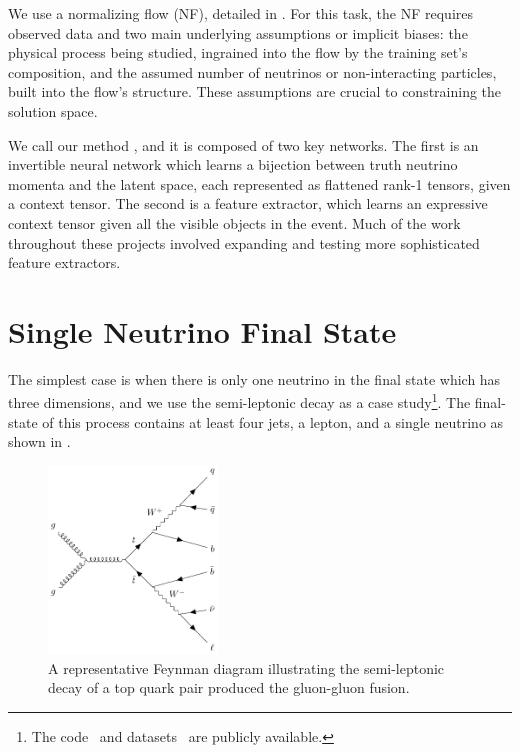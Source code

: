 We use a normalizing flow (NF), detailed in .
For this task, the NF requires observed data and two main underlying assumptions or implicit biases: the physical process being studied, ingrained into the flow by the training set's composition, and the assumed number of neutrinos or non-interacting particles, built into the flow's structure.
These assumptions are crucial to constraining the solution space.

We call our method \vvflows, and it is composed of two key networks.
The first is an invertible neural network which learns a bijection between truth neutrino momenta and the latent space, each represented as flattened rank-1 tensors, given a context tensor.
The second is a feature extractor, which learns an expressive context tensor given all the visible objects in the event.
Much of the work throughout these projects involved expanding and testing more sophisticated feature extractors.

\section{Single Neutrino Final State}

The simplest case is when there is only one neutrino in the final state which has three dimensions, and we use the semi-leptonic \ttbar decay as a case study\footnote{The code~\cite{SemileptonicTtbarNeutrino} and datasets~\cite{NuFlowsCode} are publicly available.}.
The final-state of this process contains at least four jets, a lepton, and a single neutrino as shown in .

\begin{figure}[ht]
    \center
    \includegraphics[width=0.4\textwidth]{Figures/neutrino_unfolding/feynman.pdf}
    \caption{A representative Feynman diagram illustrating the semi-leptonic decay of a top quark pair produced the gluon-gluon fusion.}
    \label{fig:feynman}
\end{figure}

